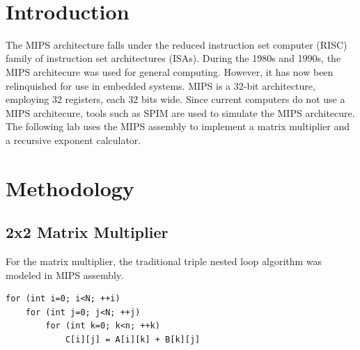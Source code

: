 \documentclass[twocolumn]{article}
\begin{document}
\

{\newpage}

\maketitle        


\section{Introduction}

The MIPS architecture falls under the reduced instruction set computer (RISC) family of instruction set architectures (ISAs). During the 1980s and 1990s, the MIPS architecure was used for general computing. However, it has now been relinquished for use in embedded systems. MIPS is a 32-bit architecture, employing 32 registers, each 32 bits wide. Since current computers do not use a MIPS architecure, tools such as SPIM are used to simulate the MIPS architecure. The following lab uses the MIPS assembly to implement a matrix multiplier and a recursive exponent calculator.

\section{Methodology}

\subsection{2x2 Matrix Multiplier}

For the matrix multiplier, the traditional triple nested loop algorithm was modeled in MIPS assembly. 

\begin{verbatim}
for (int i=0; i<N; ++i)
    for (int j=0; j<N; ++j)
        for (int k=0; k<n; ++k)
            C[i][j] = A[i][k] + B[k][j]
\end{verbatim}
\end{document}
